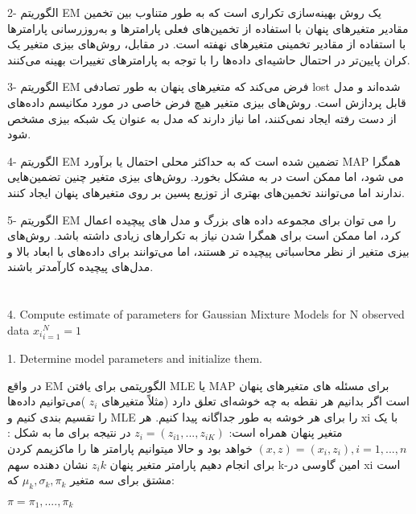 \begin{flushright}
2- الگوریتم EM یک روش بهینه‌سازی تکراری است که به طور متناوب بین تخمین مقادیر متغیرهای پنهان با استفاده از تخمین‌های فعلی پارامترها و به‌روزرسانی پارامترها با استفاده از مقادیر تخمینی متغیرهای نهفته است. در مقابل، روش‌های بیزی متغیر یک کران پایین‌تر در احتمال حاشیه‌ای داده‌ها را با توجه به پارامترهای تغییرات بهینه می‌کنند.

3- الگوریتم EM فرض می‌کند که متغیرهای پنهان به طور تصادفی  lost شده‌اند و مدل قابل پردازش است. روش‌های بیزی متغیر هیچ فرض خاصی در مورد مکانیسم داده‌های از دست رفته ایجاد نمی‌کنند، اما نیاز دارند که مدل به عنوان یک شبکه بیزی مشخص شود.

4- الگوریتم EM تضمین شده است که به حداکثر محلی احتمال یا برآورد MAP همگرا می شود، اما ممکن است در  به مشکل بخورد. روش‌های بیزی متغیر چنین تضمین‌هایی ندارند اما می‌توانند تخمین‌های بهتری از توزیع پسین بر روی متغیرهای پنهان ایجاد کنند.

5- الگوریتم EM را می توان برای مجموعه داده های بزرگ و مدل های پیچیده اعمال کرد، اما ممکن است برای همگرا شدن نیاز به تکرارهای زیادی داشته باشد. روش‌های بیزی متغیر از نظر محاسباتی پیچیده تر هستند، اما می‌توانند برای داده‌های با ابعاد بالا و مدل‌های پیچیده کارآمدتر باشند.
\end{flushright}
\newpage
\huge
\raggedright \section{}
\large
\begin{latin}
4. Compute estimate of parameters for Gaussian Mixture Models for N observed data ${{x_i}}_{i=1}^{N} = 1$

1. Determine model parameters and initialize them.

\end{latin}
\raggedleft
در واقع EM الگوریتمی برای یافتن MLE یا MAP برای مسئله های متغیرهای پنهان است اگر بدانیم هر نقطه به چه خوشه‌ای تعلق دارد (مثلاً متغیرهای $ {z_i} $ )می‌توانیم داده‌ها را تقسیم بندی کنیم و MLE را برای هر خوشه به طور جداگانه پیدا کنیم. هر xi با یک متغیر پنهان همراه است:
$z_i = (z_{i1}, . . . , z_{iK} )$
در نتیجه  برای ما به شکل :
$ (x , z) = (x_i , z_i ), i = 1, . . . , n $
خواهد بود و حالا میتوانیم پارامتر ها را ماکزیمم کردن  برای  انجام دهیم 
پارامتر متغیر پنهان $ {z_ik} $  نشان دهنده سهم k-امین گاوسی در xi است مشتق   برای سه متغیر 
$ \mu_k ,\sigma_k,\pi_k $
که:

\raggedright $ \pi = \pi_1,....,\pi_k $

